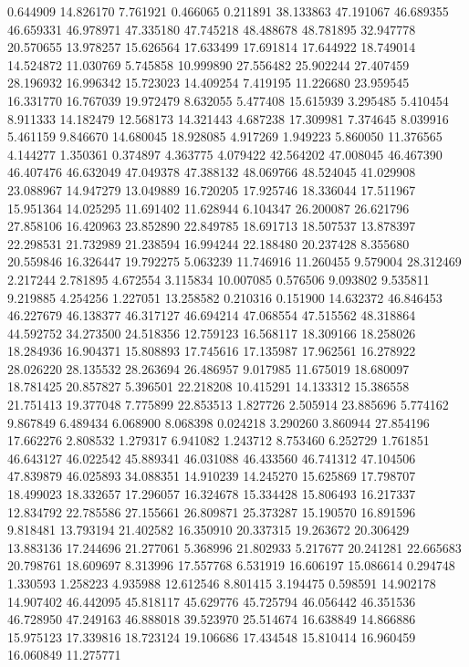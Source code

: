 0.644909
14.826170
7.761921
0.466065
0.211891
38.133863
47.191067
46.689355
46.659331
46.978971
47.335180
47.745218
48.488678
48.781895
32.947778
20.570655
13.978257
15.626564
17.633499
17.691814
17.644922
18.749014
14.524872
11.030769
5.745858
10.999890
27.556482
25.902244
27.407459
28.196932
16.996342
15.723023
14.409254
7.419195
11.226680
23.959545
16.331770
16.767039
19.972479
8.632055
5.477408
15.615939
3.295485
5.410454
8.911333
14.182479
12.568173
14.321443
4.687238
17.309981
7.374645
8.039916
5.461159
9.846670
14.680045
18.928085
4.917269
1.949223
5.860050
11.376565
4.144277
1.350361
0.374897
4.363775
4.079422
42.564202
47.008045
46.467390
46.407476
46.632049
47.049378
47.388132
48.069766
48.524045
41.029908
23.088967
14.947279
13.049889
16.720205
17.925746
18.336044
17.511967
15.951364
14.025295
11.691402
11.628944
6.104347
26.200087
26.621796
27.858106
16.420963
23.852890
22.849785
18.691713
18.507537
13.878397
22.298531
21.732989
21.238594
16.994244
22.188480
20.237428
8.355680
20.559846
16.326447
19.792275
5.063239
11.746916
11.260455
9.579004
28.312469
2.217244
2.781895
4.672554
3.115834
10.007085
0.576506
9.093802
9.535811
9.219885
4.254256
1.227051
13.258582
0.210316
0.151900
14.632372
46.846453
46.227679
46.138377
46.317127
46.694214
47.068554
47.515562
48.318864
44.592752
34.273500
24.518356
12.759123
16.568117
18.309166
18.258026
18.284936
16.904371
15.808893
17.745616
17.135987
17.962561
16.278922
28.026220
28.135532
28.263694
26.486957
9.017985
11.675019
18.680097
18.781425
20.857827
5.396501
22.218208
10.415291
14.133312
15.386558
21.751413
19.377048
7.775899
22.853513
1.827726
2.505914
23.885696
5.774162
9.867849
6.489434
6.068900
8.068398
0.024218
3.290260
3.860944
27.854196
17.662276
2.808532
1.279317
6.941082
1.243712
8.753460
6.252729
1.761851
46.643127
46.022542
45.889341
46.031088
46.433560
46.741312
47.104506
47.839879
46.025893
34.088351
14.910239
14.245270
15.625869
17.798707
18.499023
18.332657
17.296057
16.324678
15.334428
15.806493
16.217337
12.834792
22.785586
27.155661
26.809871
25.373287
15.190570
16.891596
9.818481
13.793194
21.402582
16.350910
20.337315
19.263672
20.306429
13.883136
17.244696
21.277061
5.368996
21.802933
5.217677
20.241281
22.665683
20.798761
18.609697
8.313996
17.557768
6.531919
16.606197
15.086614
0.294748
1.330593
1.258223
4.935988
12.612546
8.801415
3.194475
0.598591
14.902178
14.907402
46.442095
45.818117
45.629776
45.725794
46.056442
46.351536
46.728950
47.249163
46.888018
39.523970
25.514674
16.638849
14.866886
15.975123
17.339816
18.723124
19.106686
17.434548
15.810414
16.960459
16.060849
11.275771
